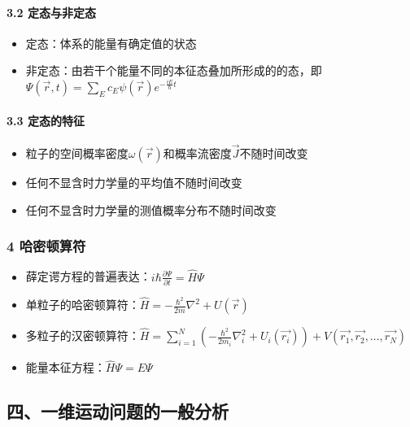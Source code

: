 \documentclass[UTF8,twocolumn]{ctexart}
\providecommand{\tightlist}{%
  \setlength{\itemsep}{0pt}\setlength{\parskip}{0pt}}
\let\oldparagraph\paragraph
\renewcommand{\paragraph}[1]{\oldparagraph{#1}\mbox{}}
\begin{document}
\hypertarget{ux5b9aux6001ux4e0eux975eux5b9aux6001}{%
\paragraph{{ }3.2
定态与非定态}\label{ux5b9aux6001ux4e0eux975eux5b9aux6001}}

\begin{itemize}
\tightlist
\item
  定态：体系的能量有确定值的状态
\item
  非定态：由若干个能量不同的本征态叠加所形成的的态，即\(\Psi(\vec{r},t)=\sum_Ec_E\psi(\vec{r})e^{-\frac{iE}{\hbar}t}\)
\end{itemize}

\hypertarget{ux5b9aux6001ux7684ux7279ux5f81}{%
\paragraph{{ }3.3 定态的特征}\label{ux5b9aux6001ux7684ux7279ux5f81}}

\begin{itemize}
\tightlist
\item
  粒子的空间概率密度\(\omega(\vec{r})\)和概率流密度\(\vec{J}\)不随时间改变
\item
  任何不显含时力学量的平均值不随时间改变
\item
  任何不显含时力学量的测值概率分布不随时间改变
\end{itemize}

\hypertarget{ux54c8ux5bc6ux987fux7b97ux7b26}{%
\subsubsection{4 哈密顿算符}\label{ux54c8ux5bc6ux987fux7b97ux7b26}}

\begin{itemize}
\tightlist
\item
  薛定谔方程的普遍表达：\(i\hbar\frac{\partial\Psi}{\partial t}=\hat{H}\Psi\)
\item
  单粒子的哈密顿算符：\(\hat{H}=-\frac{\hbar^2}{2m}\nabla^2+U(\vec{r})\)
\item
  多粒子的汉密顿算符：\(\hat{H}=\sum_{i=1}^N(-\frac{\hbar^2}{2m_i}\nabla_i^2+U_i(\vec{r_i}))+V(\vec{r_1},\vec{r_2},\ldots,\vec{r_N})\)
\item
  能量本征方程：\(\hat{H}\Psi=E\Psi\)
\end{itemize}

\hypertarget{ux56dbux4e00ux7ef4ux8fd0ux52a8ux95eeux9898ux7684ux4e00ux822cux5206ux6790}{%
\subsection{四、一维运动问题的一般分析}\label{ux56dbux4e00ux7ef4ux8fd0ux52a8ux95eeux9898ux7684ux4e00ux822cux5206ux6790}}
\end{document}
